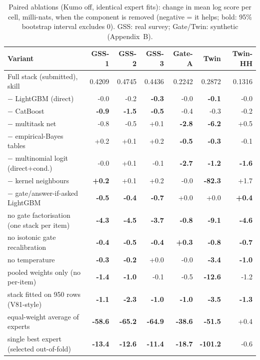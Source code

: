 \begin{table}[t]
\centering
\scriptsize
\setlength{\tabcolsep}{3pt}
\caption{Paired ablations (Kumo off, identical expert fits): change in mean log score per cell, milli-nats, when the component is removed (negative = it helps; bold: 95\% bootstrap interval excludes 0). GSS: real survey; Gate/Twin: synthetic (Appendix~B).}
\label{tab:ablation}
\begin{tabular}{lrrrrrr}
\toprule
Variant & GSS-1 & GSS-2 & GSS-3 & Gate-A & Twin & Twin-HH \\
\midrule
Full stack (submitted), skill & 0.4209 & 0.4745 & 0.4436 & 0.2242 & 0.2872 & 0.1316 \\
\midrule
$-$ LightGBM (direct) & -0.0 & -0.2 & \textbf{-0.3} & -0.0 & \textbf{-0.1} & -0.0 \\
$-$ CatBoost & \textbf{-0.9} & \textbf{-1.5} & \textbf{-0.5} & -0.4 & -0.3 & -0.2 \\
$-$ multitask net & -0.8 & -0.5 & +0.1 & \textbf{-2.8} & \textbf{-6.2} & +0.5 \\
$-$ empirical-Bayes tables & +0.2 & +0.1 & +0.2 & \textbf{-0.5} & \textbf{-0.3} & -0.1 \\
$-$ multinomial logit (direct+cond.) & -0.0 & +0.1 & -0.1 & \textbf{-2.7} & \textbf{-1.2} & \textbf{-1.6} \\
$-$ kernel neighbours & \textbf{+0.2} & +0.1 & +0.2 & -0.0 & \textbf{-82.3} & +1.7 \\
$-$ gate/answer-if-asked LightGBM & \textbf{-0.5} & \textbf{-0.4} & \textbf{-0.7} & +0.0 & +0.0 & \textbf{+0.4} \\
no gate factorisation (one stack per item) & \textbf{-4.3} & \textbf{-4.5} & \textbf{-3.7} & \textbf{-0.8} & \textbf{-9.1} & \textbf{-4.6} \\
no isotonic gate recalibration & \textbf{-0.4} & \textbf{-0.5} & \textbf{-0.4} & \textbf{+0.3} & \textbf{-0.8} & \textbf{-0.7} \\
no temperature & \textbf{-0.3} & \textbf{-0.2} & +0.0 & -0.0 & \textbf{-3.4} & \textbf{-1.0} \\
pooled weights only (no per-item) & \textbf{-1.4} & \textbf{-1.0} & -0.1 & -0.5 & \textbf{-12.6} & -1.2 \\
stack fitted on 950 rows (V81-style) & \textbf{-1.1} & \textbf{-2.3} & \textbf{-1.0} & \textbf{-1.0} & \textbf{-3.5} & \textbf{-1.3} \\
equal-weight average of experts & \textbf{-58.6} & \textbf{-65.2} & \textbf{-64.9} & \textbf{-38.6} & \textbf{-51.5} & +0.4 \\
single best expert (selected out-of-fold) & \textbf{-13.4} & \textbf{-12.6} & \textbf{-11.4} & \textbf{-18.7} & \textbf{-101.2} & -0.6 \\
\bottomrule
\end{tabular}
\end{table}
